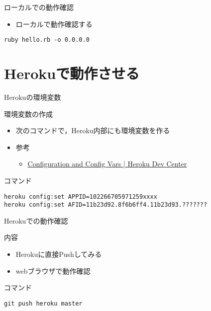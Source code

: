 \documentclass[t, aspectratio=169]{beamer}
\begin{document}
\begin{frame}[fragile,label=sec-9-1-5]{ローカルでの動作確認}
 \begin{itemize}
\item ローカルで動作確認する
\end{itemize}

\begin{verbatim}
ruby hello.rb -o 0.0.0.0
\end{verbatim}
\end{frame}
\section{Herokuで動作させる}
\label{sec-9-2}
\begin{frame}[fragile,label=sec-9-2-1]{Herokuの環境変数}
 \begin{block}{環境変数の作成}
\begin{itemize}
\item 次のコマンドで，Heroku内部にも環境変数を作る
\item 参考
\begin{itemize}
\item \href{https://devcenter.heroku.com/articles/config-vars}{Configuration and Config Vars | Heroku Dev Center}
\end{itemize}
\end{itemize}
\end{block}

\begin{block}{コマンド}
\begin{verbatim}
heroku config:set APPID=102266705971259xxxx
heroku config:set AFID=11b23d92.8f6b6ff4.11b23d93.???????
\end{verbatim}
\end{block}
\end{frame}
\begin{frame}[fragile,label=sec-9-2-2]{Herokuでの動作確認}
 \begin{block}{内容}
\begin{itemize}
\item Herokuに直接Pushしてみる
\item webブラウザで動作確認
\end{itemize}
\end{block}
\begin{block}{コマンド}
\begin{verbatim}
git push heroku master
\end{verbatim}
\end{block}
\end{frame}
\end{document}
